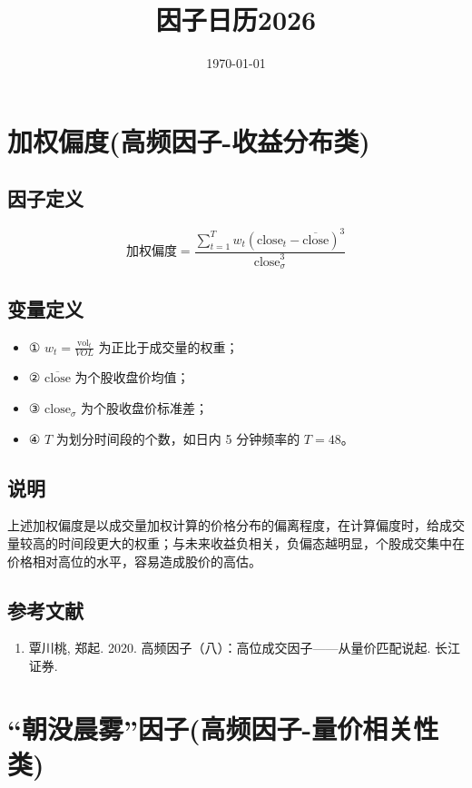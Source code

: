 \documentclass{article}
\title{因子日历2026}
\date{\today}
\begin{document}
\maketitle

\section{加权偏度(高频因子-收益分布类)}

\subsection{因子定义}
\begin{equation}
    \text{加权偏度} = \frac{ \sum_{t=1}^T w_t (\mathrm{close}_t - \overline{\mathrm{close}})^3}{\mathrm{close}_{\sigma}^3}
\end{equation}

\subsection{变量定义}
\begin{itemize}
    \item ① \( w_t = \frac{\mathrm{vol}_t}{VOL} \) 为正比于成交量的权重；
    \item ② \( \overline{\mathrm{close}} \) 为个股收盘价均值；
    \item ③ \( \mathrm{close}_{\sigma} \) 为个股收盘价标准差；
    \item ④ \( T \) 为划分时间段的个数，如日内 5 分钟频率的 \( T=48 \)。
\end{itemize}

\subsection{说明}
上述加权偏度是以成交量加权计算的价格分布的偏离程度，在计算偏度时，给成交量较高的时间段更大的权重；与未来收益负相关，负偏态越明显，个股成交集中在价格相对高位的水平，容易造成股价的高估。

\subsection{参考文献}
\begin{enumerate}
    \item 覃川桃, 郑起. 2020. 高频因子（八）：高位成交因子——从量价匹配说起. 长江证券.
\end{enumerate}

\section{“朝没晨雾”因子(高频因子-量价相关性类)}
\end{document}
